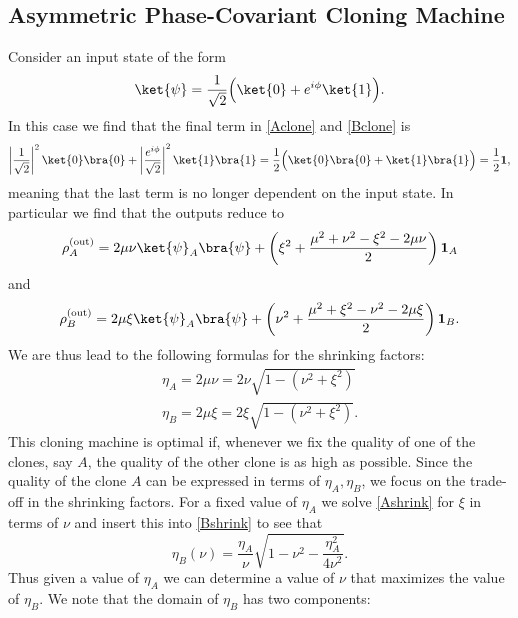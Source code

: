 \documentclass[reqno]{amsart}
\numberwithin{lemma}{section}
\numberwithin{proposition}{section}
\begin{document}
\subsection{Asymmetric Phase-Covariant Cloning Machine}
Consider an input state of the form
\begin{equation*}
    \ket{\psi} = \frac{1}{\sqrt{2}} \Big ( \ket{0} + e^{i\phi} \ket{1} \Big ).
\end{equation*}
In this case we find that the final term in \eqref{Aclone} and \eqref{Bclone} is 
\begin{align*}
    \left \vert \frac{1}{\sqrt{2}} \right \vert^{2} \ket{0} \bra{0} + \left \vert \frac{e^{i\phi}}{\sqrt{2}} \right \vert^{2} \ket{1} \bra{1} = \frac{1}{2} \Big ( \ket{0} \bra{0} + \ket{1} \bra{1} \Big ) = \frac{1}{2} \mathbf{1},
\end{align*}
meaning that the last term is no longer dependent on the input state. In particular we find that the outputs reduce to
\begin{equation}
\label{PCAclone}
    \rho_{A}^{\text{(out)}} = 2 \mu \nu \ket{\psi}_{A} \bra{\psi} + \left ( \xi^{2} + \frac{\mu^{2} + \nu^{2} - \xi^{2} - 2\mu \nu}{2} \right )  \mathbf{1}_{A} 
\end{equation}
and
\begin{equation}
\label{PCBclone}
    \rho_{B}^{\text{(out)}} = 2 \mu \xi \ket{\psi}_{A} \bra{\psi} + \left ( \nu^{2} + \frac{\mu^{2} + \xi^{2} - \nu^{2} - 2\mu \xi}{2} \right ) \mathbf{1}_{B}.
\end{equation}
We are thus lead to the following formulas for the shrinking factors:
\begin{align}
    \eta_{A} = 2 \mu \nu = 2\nu \sqrt{1 - (\nu^{2} + \xi^{2})} \label{Ashrink}\\
    \eta_{B} = 2 \mu \xi = 2 \xi \sqrt{1 - (\nu^{2} + \xi^{2})} \label{Bshrink}.
\end{align}
This cloning machine is optimal if, whenever we fix the quality of one of the clones, say $A$, the quality of the other clone is as high as possible. Since the quality of the clone $A$ can be expressed in terms of $\eta_{A}, \eta_{B}$, we focus on the trade-off in the shrinking factors. For a fixed value of $\eta_{A}$ we solve \eqref{Ashrink} for $\xi$ in terms of $\nu$ and insert this into \eqref{Bshrink} to see that
\begin{equation*}
    \eta_{B}(\nu) = \frac{\eta_{A}}{\nu} \sqrt{1 - \nu^{2} - \frac{\eta_{A}^{2}}{4 \nu^{2}}}.
\end{equation*}
Thus given a value of $\eta_{A}$ we can determine a value of $\nu$ that maximizes the value of $\eta_{B}.$ We note that the domain of $\eta_{B}$ has two components:
\end{document}
